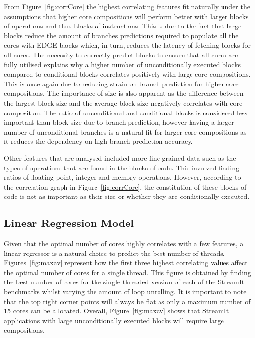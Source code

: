 From Figure~\ref{fig:corrCore} the highest correlating features fit naturally under the assumptions that higher core compositions will perform better with larger blocks of operations and thus blocks of instructions.
This is due to the fact that large blocks reduce the amount of branches predictions required to populate all the cores with EDGE blocks which, in turn, reduces the latency of fetching blocks for all cores.
The necessity to correctly predict blocks to ensure that all cores are fully utilised explains why a higher number of unconditionally executed blocks compared to conditional blocks correlates positively with large core compositions.
This is once again due to reducing strain on branch prediction for higher core compositions.
The importance of size is also apparent as the difference between the largest block size and the average block size negatively correlates with core-composition.
The ratio of unconditional and conditional blocks is considered less important than block size due to branch prediction, however having a larger number of unconditional branches is a natural fit for larger core-compositions as it reduces the dependency on high branch-prediction accuracy.

Other features that are analysed included more fine-grained data such as the types of operations that are found in the blocks of code.
This involved finding ratios of floating point, integer and memory operations.
However, according to the correlation graph in Figure~\ref{fig:corrCore}, the constitution of these blocks of code is not as important as their size or whether they are conditionally executed.


\subsection{Linear Regression Model}
Given that the optimal number of cores highly correlates with a few features, a linear regressor is a natural choice to predict the best number of threads.
Figures~\ref{fig:maxav} represent how the first three highest correlating values affect the optimal number of cores for a single thread.
This figure is obtained by finding the best number of cores for the single threaded version of each of the StreamIt benchmarks whilst varying the amount of loop unrolling.
It is important to note that the top right corner points will always be flat as only a maximum number of 15 cores can be allocated.
Overall, Figure~\ref{fig:maxav} shows that StreamIt applications with large unconditionally executed blocks will require large compositions.


